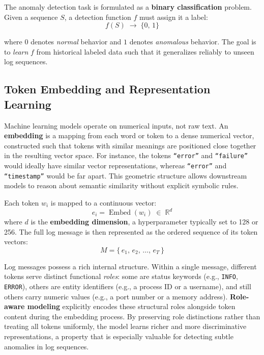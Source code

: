 The anomaly detection task is formulated as a \textbf{binary classification} problem. Given a sequence $S$, a detection function $f$ must assign it a label:
\begin{equation}
f(S) \;\longrightarrow\; \{0,\,1\}
\end{equation}

where $0$ denotes \emph{normal} behavior and $1$ denotes \emph{anomalous} behavior. The goal is to \emph{learn} $f$ from historical labeled data such that it generalizes reliably to unseen log sequences.

\subsection{Token Embedding and Representation Learning}


Machine learning models operate on numerical inputs, not raw text. An \textbf{embedding} is a mapping from each word or token to a dense numerical vector, constructed such that tokens with similar meanings are positioned close together in the resulting vector space. For instance, the tokens \texttt{``error''} and \texttt{``failure''} would ideally have similar vector representations, whereas \texttt{``error''} and \texttt{``timestamp''} would be far apart. This geometric structure allows downstream models to reason about semantic similarity without explicit symbolic rules.

Each token $w_i$ is mapped to a continuous vector:
\begin{equation}
e_i = \operatorname{Embed}(w_i) \;\in\; \mathbb{R}^d
\end{equation}
where $d$ is the \textbf{embedding dimension}, a hyperparameter typically set to 128 or 256. The full log message is then represented as the ordered sequence of its token vectors:
\begin{equation}
M = \{\, e_1,\, e_2,\, \dots,\, e_T \,\}
\end{equation}


Log messages possess a rich internal structure. Within a single message, different tokens serve distinct functional \emph{roles}: some are status keywords (e.g., \texttt{INFO}, \texttt{ERROR}), others are entity identifiers (e.g., a process ID or a username), and still others carry numeric values (e.g., a port number or a memory address). \textbf{Role-aware modeling} explicitly encodes these structural roles alongside token content during the embedding process. By preserving role distinctions rather than treating all tokens uniformly, the model learns richer and more discriminative representations, a property that is especially valuable for detecting subtle anomalies in log sequences.


